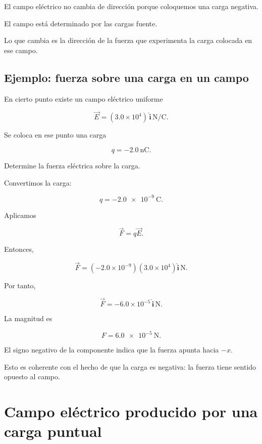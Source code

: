 \begin{idea}

El campo eléctrico no cambia de dirección porque coloquemos una carga negativa.

El campo está determinado por las cargas fuente.

Lo que cambia es la dirección de la fuerza que experimenta la carga colocada en ese
campo.

\end{idea}


\subsection{Ejemplo: fuerza sobre una carga en un campo}

\begin{ejemplo}

En cierto punto existe un campo eléctrico uniforme

\[
\vec E=(3.0\times10^4)\,\hat{\mathbf i}\,\si{\newton\per\coulomb}.
\]

Se coloca en ese punto una carga

\[
q=-\SI{2.0}{\nano\coulomb}.
\]

Determine la fuerza eléctrica sobre la carga.

\end{ejemplo}

Convertimos la carga:

\[
q=-\SI{2.0e-9}{\coulomb}.
\]

Aplicamos

\[
\vec F=q\vec E.
\]

Entonces,

\[
\vec F=(-2.0\times10^{-9})(3.0\times10^4)\hat{\mathbf i}\,\si{\newton}.
\]

Por tanto,

\[
\boxed{\vec F=-6.0\times10^{-5}\,\hat{\mathbf i}\,\si{\newton}}.
\]

La magnitud es

\[
\boxed{F=\SI{6.0e-5}{\newton}}.
\]

El signo negativo de la componente indica que la fuerza apunta hacia \(-x\).

Esto es coherente con el hecho de que la carga es negativa: la fuerza tiene sentido
opuesto al campo.


\section{Campo eléctrico producido por una carga puntual}

